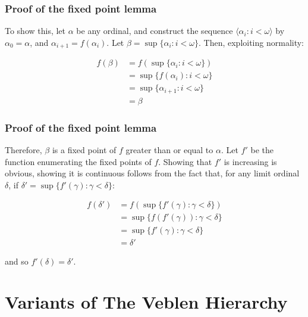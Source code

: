 \documentclass{beamer}
\begin{document}
\begin{frame}
\frametitle{Proof of the fixed point lemma}

To show this, let $\alpha$ be any ordinal, and construct the sequence $\langle \alpha_i: i < \omega \rangle$ by $\alpha_0 = \alpha$, and $\alpha_{i + 1} = f(\alpha_i)$. \pause Let $\beta = \sup\{\alpha_i: i < \omega\}$. Then, exploiting normality:

\begin{equation}
\begin{split}
f(\beta) & = f(\sup\{\alpha_i: i < \omega\}) \\ & = \sup\{f(\alpha_i): i < \omega\} \\ & = \sup\{\alpha_{i+1}: i < \omega\} \\ & = \beta
\end{split}
\end{equation}
\end{frame}

\begin{frame}
\frametitle{Proof of the fixed point lemma}

Therefore, $\beta$ is a fixed point of $f$ greater than or equal to $\alpha$. Let $f'$ be the function enumerating the fixed points of $f$. \pause Showing that $f'$ is increasing is obvious, showing it is continuous follows from the fact that, for any limit ordinal $\delta$, if $\delta' = \sup\{f'(\gamma): \gamma < \delta\}$:

\begin{equation}
\begin{split}
f(\delta') & = f(\sup\{f'(\gamma): \gamma < \delta\}) \\ & = \sup\{f(f'(\gamma)): \gamma < \delta\} \\ & = \sup\{f'(\gamma): \gamma < \delta\} \\ & = \delta'
\end{split}
\end{equation}

and so $f'(\delta) = \delta'$.
\end{frame}

\section{Variants of The Veblen Hierarchy}
\end{document}
